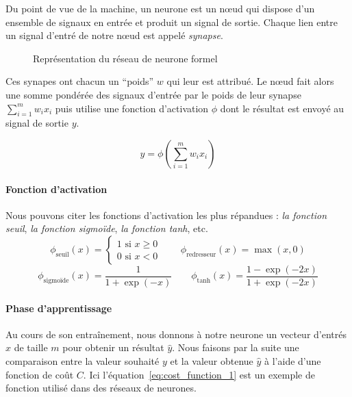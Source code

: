 \documentclass{report}
\begin{document}
	Du point de vue de la machine, un neurone est un n\oe ud qui dispose d'un ensemble de signaux en entrée et produit un signal de sortie.
	Chaque lien entre un signal d'entré de notre n\oe ud est appelé \textit{synapse}.
	
	\begin{figure}[ht]	
		\centering
		\caption{Représentation du réseau de neurone formel}
	\end{figure}
	
	Ces synapes ont chacun un ``poids'' $w$ qui leur est attribué.
	Le n\oe ud fait alors une somme pondérée des signaux d'entrée par le poids de leur synapse $\sum_{i=1}^m w_i x_i$ puis utilise une fonction d'activation $\phi$ dont le résultat est envoyé au signal de sortie $y$.

	\begin{equation}
		y = \phi\left(\sum_{i=1}^m w_i x_i \right)
	\end{equation}

	\paragraph{Fonction d'activation}
	Nous pouvons citer les fonctions d'activation les plus répandues : \textit{la fonction seuil}, \textit{la fonction sigmo\"ide}, \textit{la fonction tanh}, etc.
	\begin{equation}
		\phi_\text{seuil}(x) =
		\begin{cases}
			1 \text{ si } x \geq 0 \\
			0 \text{ si } x < 0
		\end{cases} \qquad
		\phi_\text{redresseur}(x) = \max(x, 0)
	\end{equation}
	\begin{equation}
		\phi_\text{sigmo\"ide}(x) = \frac{1}{1+\exp(-x)} \qquad
		\phi_\text{tanh}(x) = \frac{1-\exp(-2x)}{1+\exp(-2x)}
	\end{equation}

	\paragraph{Phase d'apprentissage}
	Au cours de son entraînement, nous donnons à notre neurone un vecteur d'entrés $x$ de taille $m$ pour obtenir un résultat $\hat y$.
	Nous faisons par la suite une comparaison entre la valeur souhaité $y$ et la valeur obtenue $\hat y$ à l'aide d'une fonction de coût $C$.
	Ici l'équation~\ref{eq:cost_function_1} est un exemple de fonction utilisé dans des réseaux de neurones.
	
\end{document}
